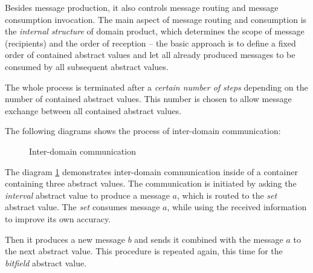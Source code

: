 \documentclass[12pt,oneside]{fithesis2}
\theoremstyle{definition}
\begin{document}
Besides message production, it also controls message routing and message consumption invocation. The main aspect of message routing and consumption is the \textit{internal structure} of domain product, which determines the scope of message (recipients) and the order of reception -- the basic approach is to define a fixed order of contained abstract values and let all already produced messages to be consumed by all subsequent abstract values.

The whole process is terminated after a \textit{certain number of steps} depending on the number of contained abstract values. This number is chosen to allow message exchange between all contained abstract values.

\vspace{1\baselineskip} %

The following diagrams shows the process of inter-domain communication:

\begin{figure}[ht!]
  \centering
  \caption{Inter-domain communication}
  \label{fig:communication}
\end{figure}

The diagram \ref{fig:communication} demonstrates inter-domain communication inside of a container containing three abstract values. The communication is initiated by asking the \textit{interval} abstract value to produce a message $a$, which is routed to the \textit{set} abstract value. The \textit{set} consumes message $a$, while using the received information to improve its own accuracy.

Then it produces a new message $b$ and sends it combined with the message $a$ to the next abstract value. This procedure is repeated again, this time for the \textit{bitfield} abstract value.
\end{document}
